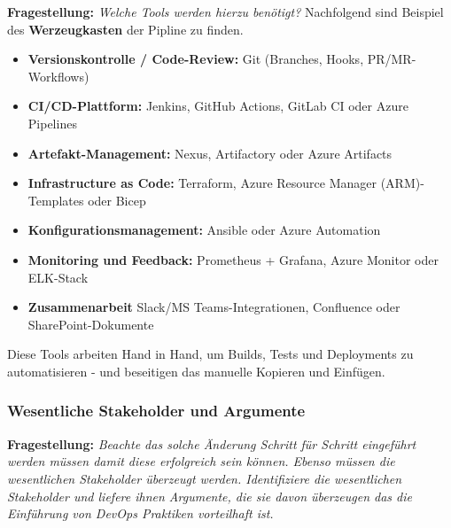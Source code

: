 \textbf{Fragestellung:} \textit{Welche Tools werden hierzu benötigt?}
Nachfolgend sind Beispiel des \textbf{Werzeugkasten} der Pipline zu finden.
\begin{itemize}
    \item \textbf{Versionskontrolle / Code-Review:} Git (Branches, Hooks, PR/MR-Workflows)
    \item \textbf{CI/CD-Plattform:} Jenkins, GitHub Actions, GitLab CI oder Azure Pipelines
    \item \textbf{Artefakt-Management:} Nexus, Artifactory oder Azure Artifacts
    \item \textbf{Infrastructure as Code:} Terraform, Azure Resource Manager (ARM)-Templates oder Bicep
    \item \textbf{Konfigurationsmanagement:} Ansible oder Azure Automation
    \item \textbf{Monitoring und Feedback:} Prometheus + Grafana, Azure Monitor oder ELK-Stack
    \item \textbf{Zusammenarbeit} Slack/MS Teams-Integrationen, Confluence oder SharePoint-Dokumente
\end{itemize}
Diese Tools arbeiten Hand in Hand, um Builds, Tests und Deployments zu automatisieren - und beseitigen das manuelle Kopieren und Einfügen.

\subsubsection{Wesentliche Stakeholder und Argumente}

\textbf{Fragestellung:} \textit{Beachte das solche Änderung Schritt für Schritt eingeführt werden müssen damit diese
erfolgreich sein können. Ebenso müssen die wesentlichen Stakeholder überzeugt werden.
Identifiziere die wesentlichen Stakeholder und liefere ihnen Argumente, die sie davon
überzeugen das die Einführung von DevOps Praktiken vorteilhaft ist.}

